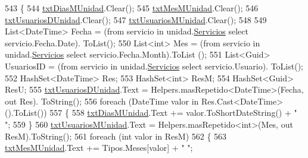 \begin{DoxyCode}
543         \{
544             \hyperlink{class_proyecto___integrador__3_1_1_reportes_1_1_reporte_frecuencia_de_uso_ac57af5c45eb5829244bdb033e19a7ea8}{txtDiasMUnidad}.Clear();
545             \hyperlink{class_proyecto___integrador__3_1_1_reportes_1_1_reporte_frecuencia_de_uso_ae9d8312f5f3d8cef187f25210a97ad43}{txtMesMUnidad}.Clear();
546             \hyperlink{class_proyecto___integrador__3_1_1_reportes_1_1_reporte_frecuencia_de_uso_a0b2b2103ff7f1f55f8698b23e1672dbe}{txtUsuariosDUnidad}.Clear();
547             \hyperlink{class_proyecto___integrador__3_1_1_reportes_1_1_reporte_frecuencia_de_uso_a94304e1e8d7eae9ba6aad17385c65664}{txtUsuariosMUnidad}.Clear();
548 
549             List<DateTime> Fecha = (from servicio in unidad.\hyperlink{class_proyecto___integrador__3_1_1_tipos_dato_1_1_unidad_aca85e685e50da0af6be67e3ee69b1bb1}{Servicios} select servicio.Fecha.Date).
      ToList();
550             List<int> Mes = (from servicio in unidad.\hyperlink{class_proyecto___integrador__3_1_1_tipos_dato_1_1_unidad_aca85e685e50da0af6be67e3ee69b1bb1}{Servicios} select servicio.Fecha.Month).ToList
      ();
551             List<Guid> UsuariosID = (from servicio in unidad.\hyperlink{class_proyecto___integrador__3_1_1_tipos_dato_1_1_unidad_aca85e685e50da0af6be67e3ee69b1bb1}{Servicios} select servicio.Usuario).
      ToList();
552             HashSet<DateTime> Res;
553             HashSet<int> ResM;
554             HashSet<Guid> ResU;
555             \hyperlink{class_proyecto___integrador__3_1_1_reportes_1_1_reporte_frecuencia_de_uso_a0b2b2103ff7f1f55f8698b23e1672dbe}{txtUsuariosDUnidad}.Text = Helpers.masRepetido<DateTime>(Fecha, out Res).
      ToString();
556             \textcolor{keywordflow}{foreach} (DateTime valor \textcolor{keywordflow}{in} Res.Cast<DateTime>().ToList())
557             \{
558                 \hyperlink{class_proyecto___integrador__3_1_1_reportes_1_1_reporte_frecuencia_de_uso_ac57af5c45eb5829244bdb033e19a7ea8}{txtDiasMUnidad}.Text += valor.ToShortDateString() + \textcolor{stringliteral}{" "};
559             \}
560             \hyperlink{class_proyecto___integrador__3_1_1_reportes_1_1_reporte_frecuencia_de_uso_a94304e1e8d7eae9ba6aad17385c65664}{txtUsuariosMUnidad}.Text = Helpers.masRepetido<\textcolor{keywordtype}{int}>(Mes, out ResM).ToString();
561             \textcolor{keywordflow}{foreach} (\textcolor{keywordtype}{int} valor \textcolor{keywordflow}{in} ResM)
562             \{
563                 \hyperlink{class_proyecto___integrador__3_1_1_reportes_1_1_reporte_frecuencia_de_uso_ae9d8312f5f3d8cef187f25210a97ad43}{txtMesMUnidad}.Text += Tipos.Meses[valor] + \textcolor{stringliteral}{" "};

\end{DoxyCode}
